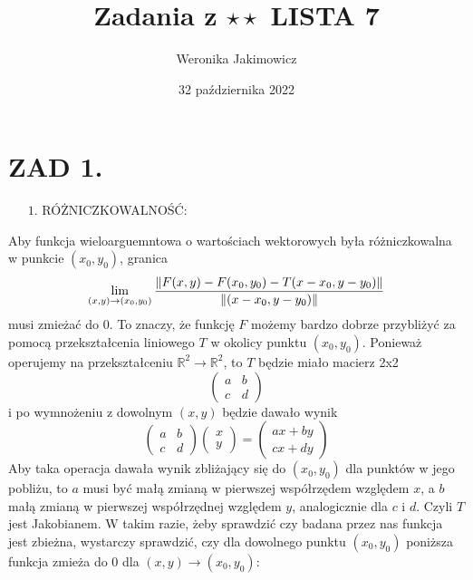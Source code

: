 \documentclass{article}[13pt]
\author{Weronika Jakimowicz}
\title{Zadania z $\star\star$ LISTA 7}
\date{32 października 2022}
\newcommand{\R}{\mathds{R}}
\begin{document}
\maketitle

\section*{ZAD 1.}

{\color{red}$\quad\;\;1$. RÓŻNICZKOWALNOŚĆ:}
\medskip

Aby funkcja wieloarguemntowa o wartościach wektorowych była różniczkowalna w punkcie $(x_0,y_0)$, granica
$$\lim\limits_{(x,y)\to(x_0,y_0)}{\|F(x,y)-F(x_0,y_0)-T(x-x_0,y-y_0)\|\over\|(x-x_0,y-y_0)\|}$$
musi zmieżać do 0. To znaczy, że funkcję $F$ możemy bardzo dobrze przybliżyć za pomocą przekształcenia liniowego $T$ w okolicy punktu $(x_0,y_0)$. Ponieważ operujemy na przekształceniu $\R^2\to\R^2$, to $T$ będzie miało macierz 2x2
$$\begin{pmatrix}a & b\\ c & d\end{pmatrix}$$
i po wymnożeniu z dowolnym $(x,y)$ będzie dawało wynik
$$\begin{pmatrix}
    a & b\\
    c & d
\end{pmatrix}
\begin{pmatrix}
    x\\y
\end{pmatrix}=\begin{pmatrix}
    ax+by\\
    cx+dy
\end{pmatrix}
$$
Aby taka operacja dawała wynik zbliżający się do $(x_0,y_0)$ dla punktów w jego pobliżu, to $a$ musi być małą zmianą w pierwszej współrzędem względem $x$, a $b$ małą zmianą w pierwszej współrzędnej względem $y$, analogicznie dla $c$ i $d$. Czyli $T$ jest Jakobianem. W takim razie, żeby sprawdzić czy badana przez nas funkcja jest zbieżna, wystarczy sprawdzić, czy dla dowolnego punktu $(x_0,y_0)$ poniższa funkcja zmieża do 0 dla $(x,y)\to(x_0,y_0)$:
\end{document}
